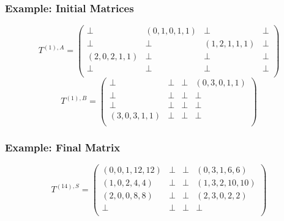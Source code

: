 \documentclass[xcolor=table]{beamer}
\begin{document}
\begin{frame}[fragile] \frametitle{Example: Initial Matrices}
\[
T^{(1),A} = \begin{pmatrix}
\bot & (0,1,0,1,1)       & \bot & \bot       \\
\bot & \bot & (1,2,1,1,1)       & \bot \\
(2,0,2,1,1)       & \bot & \bot & \bot \\
\bot       & \bot & \bot & \bot \\
\end{pmatrix}
\]
\[
T^{(1),B} = \begin{pmatrix}
\bot & \bot       & \bot & (0,3,0,1,1)       \\
\bot & \bot & \bot       & \bot \\
\bot       & \bot & \bot & \bot \\
(3,0,3,1,1)      & \bot & \bot & \bot \\
\end{pmatrix}
\]

\end{frame}

\begin{frame}[fragile] \frametitle{Example: Final Matrix}
\[
T^{(14),S} = \begin{pmatrix}
(0,0,1,12,12) & \bot       & \bot & (0,3,1,6,6)       \\
(1,0,2,4,4) & \bot & \bot       & (1,3,2,10,10) \\
(2,0,0,8,8)       & \bot & \bot & (2,3,0,2,2) \\
\bot       & \bot & \bot & \bot \\
\end{pmatrix}
\]

\end{frame}
\end{document}
